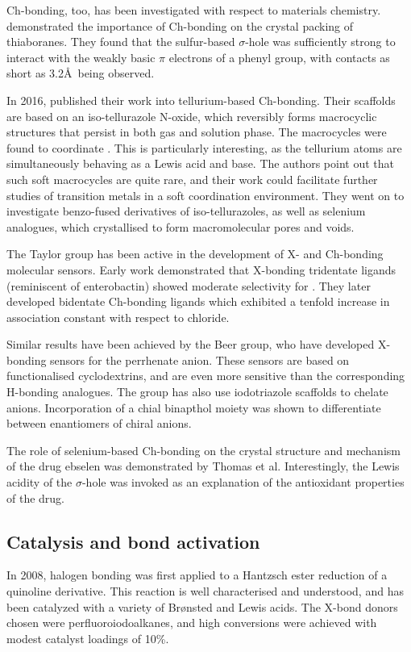 \begin{refsection}
Ch-bonding, too, has been investigated with respect to materials chemistry.
\citeauthor{Fanfrlik2014} demonstrated the importance of Ch-bonding on the crystal packing of thiaboranes.\autocite{Fanfrlik2014}
They found that the sulfur-based $\sigma$-hole was sufficiently strong to interact with the weakly basic $\pi$ electrons of a phenyl group, with contacts as short as 3.2\AA~being observed.

In 2016, \citeauthor{Ho2016} published their work into tellurium-based Ch-bonding.\autocite{Ho2016}
Their scaffolds are based on an iso-tellurazole N-oxide, which reversibly forms macrocyclic structures that persist in both gas and solution phase.
The macrocycles were found to coordinate .
This is particularly interesting, as the tellurium atoms are simultaneously behaving as a Lewis acid and base.
The authors point out that such soft macrocycles are quite rare, and their work could facilitate further studies of transition metals in a soft coordination environment.
They went on to investigate benzo-fused derivatives of iso-tellurazoles, as well as selenium analogues, which crystallised to form macromolecular pores and voids.\autocite{Ho2017}

The Taylor group has been active in the development of X- and Ch-bonding molecular sensors.
Early work demonstrated that X-bonding tridentate ligands (reminiscent of enterobactin) showed moderate selectivity for .\autocite{Dimitrijevic2010}
They later developed bidentate Ch-bonding ligands which exhibited a tenfold increase in association constant with respect to chloride.\autocite{Garrett2015a,Garrett2016}

Similar results have been achieved by the Beer group, who have developed X-bonding sensors for the perrhenate anion.\autocite{Cornes2017}
These sensors are based on functionalised cyclodextrins, and are even more sensitive than the corresponding H-bonding analogues.
The group has also use iodotriazole scaffolds to chelate anions.\autocite{Borissov2017}
Incorporation of a chial binapthol moiety was shown to differentiate between enantiomers of chiral anions.

The role of selenium-based Ch-bonding on the crystal structure and mechanism of the drug ebselen was demonstrated by Thomas et al.\autocite{Thomas2015}
Interestingly, the Lewis acidity of the $\sigma$-hole was invoked as an explanation of the antioxidant properties of the drug.

\subsection{Catalysis and bond activation}
In 2008, halogen bonding was first applied to a Hantzsch ester reduction of a quinoline derivative.\autocite{Bruckmann2008}
This reaction is well characterised and understood, and has been catalyzed with a variety of Br\o nsted and Lewis acids.
The X-bond donors chosen were perfluoroiodoalkanes, and high conversions were achieved with modest catalyst loadings of 10\%.


\end{refsection}
